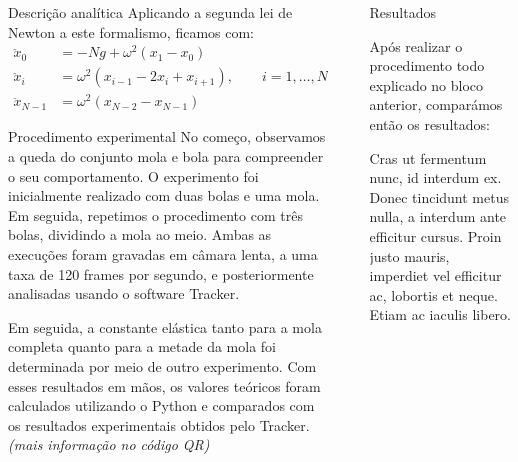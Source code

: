 \documentclass[final]{beamer}
\newlength{\sepwidth}
\newlength{\colwidth}
\newcommand{\separatorcolumn}{\begin{column}{\sepwidth}\end{column}}
\begin{document}
\begin{frame}[t]
\begin{columns}[t]
\begin{column}{\colwidth}
\begin{block}{Descrição analítica}
    Aplicando a segunda lei de Newton a este formalismo, ficamos com:
    \begin{align*}
        \ddot x_0 &=-Ng+\omega^2(x_1-x_0)\\[1cm] 
        \ddot x_i &= \omega^2(x_{i-1}-2x_i+x_{i+1}),\qquad i=1, \ldots, N-2\\[1cm]
         \ddot x_{N-1} &=\omega^2(x_{N-2}-x_{N-1})
    \end{align*}    
\end{block}

\begin{block}{Procedimento experimental}
   No começo, observamos a queda do conjunto mola e bola para compreender o seu comportamento. O experimento foi inicialmente realizado com duas bolas e uma mola. Em seguida, repetimos o procedimento com três bolas, dividindo a mola ao meio. Ambas as execuções foram gravadas em câmara lenta, a uma taxa de 120 frames por segundo, e posteriormente analisadas usando o software Tracker.
    
    Em seguida, a constante elástica tanto para a mola completa quanto para a metade da mola foi determinada por meio de outro experimento. Com esses resultados em mãos, os valores teóricos foram calculados utilizando o Python e comparados com os resultados experimentais obtidos pelo Tracker. \emph{(mais informação no código QR)}
\end{block}



\end{column}

\separatorcolumn

\begin{column}{\colwidth}


\begin{block}{Resultados}
    
    Após realizar o procedimento todo explicado no bloco anterior, comparámos então os resultados:
    

    Cras ut fermentum nunc, id interdum ex. Donec tincidunt metus nulla, a interdum ante efficitur cursus. Proin justo mauris, imperdiet vel efficitur ac, lobortis et neque. Etiam ac iaculis libero.


\end{block}
\end{column}
\end{columns}
\end{frame}
\end{document}
